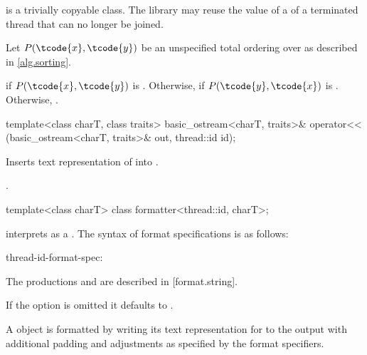 \documentclass{wg21}
\begin{document}
\pnum
{} is a trivially copyable class.
The library may reuse the value of a  of a terminated thread that can no longer be joined.


\begin{itemdescr}
    \pnum
    Let $P(\tcode{x}, \tcode{y})$ be
    an unspecified total ordering over 
    as described in \ref{alg.sorting}.

    \pnum
    \returns
     if $P(\tcode{x}, \tcode{y})$ is .
    Otherwise, 
    if $P(\tcode{y}, \tcode{x})$ is .
    Otherwise, .
\end{itemdescr}

%
\begin{itemdecl}
    template<class charT, class traits>
    basic_ostream<charT, traits>&
    operator<< (basic_ostream<charT, traits>& out, thread::id id);
\end{itemdecl}

\begin{itemdescr}
    \pnum
    \effects
    Inserts  text representation  of  into
    . 

    \pnum
    \returns
    .
\end{itemdescr}

\begin{addedblock}

\begin{itemdecl}
template<class charT> class formatter<thread::id, charT>;
\end{itemdecl}

\begin{itemdescr}
 interprets  as a . The syntax of format specifications is as follows:

\begin{bnf}
thread-id-format-spec:\br
{} 	
\end{bnf}

\begin{note}
    The productions  and  are described in [format.string].
\end{note}

If the  option is omitted it defaults to \tcode{>}.

A  object is formatted by writing its text representation for  to the output with  additional padding and adjustments as specified by the format specifiers.
\end{itemdescr}

\end{addedblock}
\end{document}
